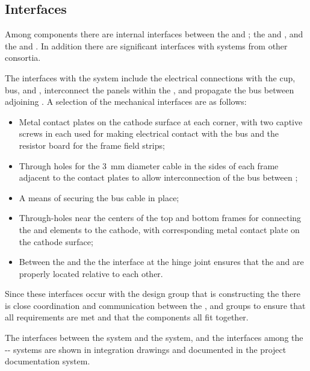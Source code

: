\subsection{Interfaces}
\label{sec:fdsp-hv-interface}

Among  components there are internal interfaces between the  and ; the  and , and  the  and . In addition there are significant interfaces with systems from other consortia.

The interfaces with the  system include the electrical connections with the  cup,  bus, and , interconnect the panels within the , and propagate the  bus between adjoining .  A selection of the mechanical interfaces are as follows:
\begin{itemize}
\item Metal contact plates on the cathode surface at each corner, with two captive screws in each used for making electrical contact with the  bus and the resistor board for the frame field strips;
\item Through holes for the \SI{3}{\milli\m} diameter cable in the sides of each frame adjacent to the contact plates to allow interconnection of the  bus between ;
\item A means of securing the  bus cable in place;
\item Through-holes near the centers of the top and bottom frames for connecting the  and  elements to the cathode, with corresponding metal contact plate on the cathode surface;
\item Between the  and the  the interface at the hinge joint ensures that the  and  are properly located relative to each other.
\end{itemize}
Since these interfaces occur with the design group that is constructing the  there is close coordination and communication between the ,  and  groups to ensure that all requirements are met and that the components all fit together.

The interfaces between the  system and the  system, and the interfaces among the -- systems are shown in integration drawings and documented in the project documentation system. 

